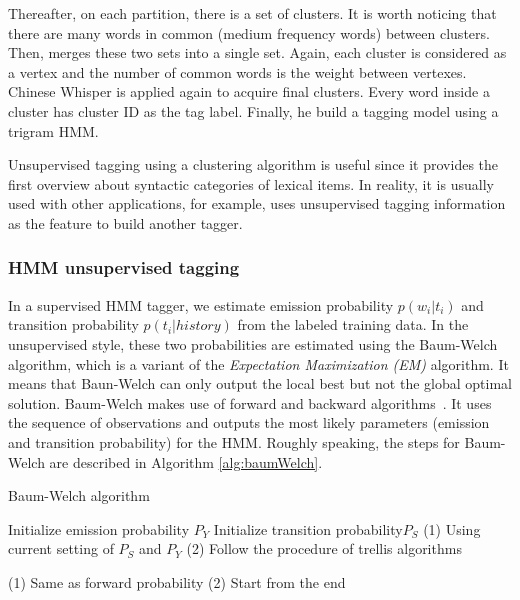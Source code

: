 Thereafter, on each partition, there is a set of clusters. It is worth noticing that there are many words in common (medium frequency words) between clusters. Then,  merges these two sets into a single set. Again, each cluster is considered as a vertex and the number of common words is the weight between vertexes. Chinese Whisper is applied  again to acquire final clusters. Every word inside a cluster has cluster ID as the tag label. Finally, he build a tagging model using a trigram HMM. 

Unsupervised tagging using a clustering algorithm is useful since it provides the first overview about syntactic categories of lexical items. In reality, it is usually used with other applications, for example,  uses unsupervised tagging information as the feature to build another tagger. 

\subsubsection{HMM unsupervised tagging}
\label{hmmUnsup}
In a supervised HMM tagger, we estimate emission probability $p(w_i|t_i)$ and transition probability $p(t_i|history)$ from the labeled training data. In the unsupervised style, these two probabilities are estimated using the Baum-Welch~\cite{BaumWelch} algorithm, which is a variant of the \textit{Expectation Maximization (EM)} algorithm. It means that Baun-Welch can only output the local best but not the global optimal solution. Baum-Welch makes use of forward and backward algorithms~\cite{forwardBackward}. It uses the sequence of observations and outputs the most likely parameters (emission and transition probability) for the HMM. Roughly speaking, the steps for Baum-Welch are described in Algorithm \ref{alg:baumWelch}. 
\begin{algorithm}
\caption{Baum-Welch algorithm}
\label{alg:baumWelch}
\begin{algorithmic} 
\STATE Initialize emission probability $P_Y$
\STATE Initialize transition probability$P_S$
\STATE (1) Using current setting of $P_S$ and $P_Y$
\STATE (2) Follow the procedure of trellis algorithms  

\STATE (1) Same as forward probability
\STATE (2) Start from the end 

\ENDFOR

\ENDWHILE
\end{algorithmic}
\end{algorithm}

